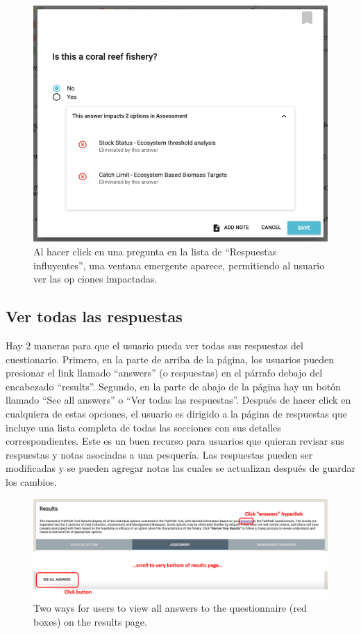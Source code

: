 \documentclass[
  11pt,
]{book}
\begin{document}
\begin{figure}

{\centering \includegraphics[width=0.75\linewidth]{images/influential-answers-expanded} 

}

\caption{Al hacer click en una pregunta en la lista de “Respuestas influyentes”, una ventana emergente aparece, permitiendo al usuario ver las op ciones impactadas.}\label{fig:influential-answers-expanded}
\end{figure}

\hypertarget{ver-todas-las-respuestas}{%
\subsection{Ver todas las respuestas}\label{ver-todas-las-respuestas}}

Hay 2 maneras para que el usuario pueda ver todas sus respuestas del cuestionario. Primero, en la parte de arriba de la página, los usuarios pueden presionar el link llamado ``answers'' (o respuestas) en el párrafo debajo del encabezado ``results''. Segundo, en la parte de abajo de la página hay un botón llamado ``See all answers'' o ``Ver todas las respuestas''. Después de hacer click en cualquiera de estas opciones, el usuario es dirigido a la página de respuestas que incluye una lista completa de todas las secciones con sus detalles correspondientes. Este es un buen recurso para usuarios que quieran revisar sus respuestas y notas asociadas a una pesquería. Las respuestas pueden ser modificadas y se pueden agregar notas las cuales se actualizan después de guardar los cambios.

\begin{figure}

{\centering \includegraphics[width=0.75\linewidth]{images/see-all-answers-buttons} 

}

\caption{Two ways for users to view all answers to the questionnaire (red boxes) on the results page.}\label{fig:answers-buttons}
\end{figure}
\end{document}
